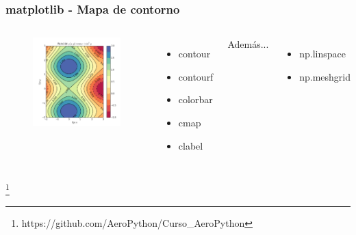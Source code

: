 \documentclass[18pt]{beamer}
\newcommand\blfootnote[1]{%
  \begingroup
  \renewcommand\thefootnote{}\footnote{#1}%
  \addtocounter{footnote}{-1}%
  \endgroup
}
\begin{document}
\begin{frame}
	
	\frametitle{matplotlib - Mapa de contorno}

	\begin{columns}
			\centering
			\begin{figure}
				\includegraphics[width=6.8cm]{images/matplotlib_mapa_contorno.png}
			\end{figure}
			
			\begin{itemize}
				\item contour
				\item contourf
				\item colorbar
				\item cmap
				\item clabel
			\end{itemize}
			
			\vspace{0.4cm}
			Además...
			\begin{itemize}
				\item np.linspace
				\item np.meshgrid
			\end{itemize}

	\end{columns}
	
	\blfootnote{\scriptsize https://github.com/AeroPython/Curso\_AeroPython}	
	
\end{frame}
\end{document}
